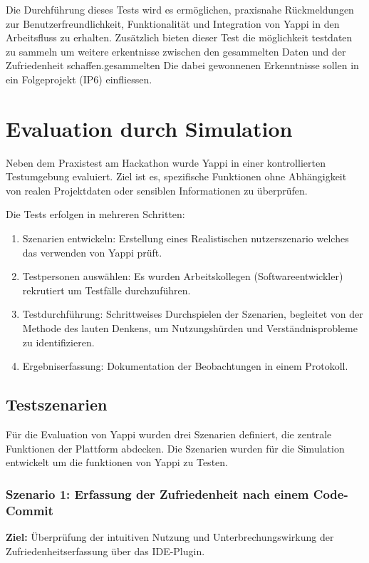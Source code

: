 \documentclass[12pt,a4paper]{report}
\begin{document}
 Die Durchführung dieses Tests wird es ermöglichen, praxisnahe Rückmeldungen zur Benutzerfreundlichkeit, Funktionalität
 und Integration von Yappi in den Arbeitsfluss zu erhalten. Zusätzlich bieten dieser Test die möglichkeit testdaten zu
 sammeln um weitere erkentnisse zwischen den gesammelten Daten und der Zufriedenheit schaffen.gesammelten Die dabei
 gewonnenen Erkenntnisse sollen in ein Folgeprojekt (IP6) einfliessen.

\section{Evaluation durch Simulation}

    Neben dem Praxistest am Hackathon wurde Yappi in einer kontrollierten Testumgebung evaluiert. Ziel ist es, spezifische
    Funktionen ohne Abhängigkeit von realen Projektdaten oder sensiblen Informationen zu überprüfen.

    Die Tests erfolgen in mehreren Schritten:
    \begin{enumerate}
        \item Szenarien entwickeln: Erstellung eines Realistischen nutzerszenario welches das verwenden von Yappi prüft.
        \item Testpersonen auswählen: Es wurden Arbeitskollegen (Softwareentwickler) rekrutiert um Testfälle durchzuführen.
        \item Testdurchführung: Schrittweises Durchspielen der Szenarien, begleitet von der Methode des lauten Denkens,
        um Nutzungshürden und Verständnisprobleme zu identifizieren.
        \item Ergebniserfassung: Dokumentation der Beobachtungen in einem Protokoll.
    \end{enumerate}


    \subsection{Testszenarien}

    Für die Evaluation von Yappi wurden drei Szenarien definiert, die zentrale Funktionen der Plattform abdecken.
    Die Szenarien wurden für die Simulation entwickelt um die funktionen von Yappi zu Testen.

    \subsubsection{Szenario 1: Erfassung der Zufriedenheit nach einem Code-Commit}
    \textbf{Ziel:} Überprüfung der intuitiven Nutzung und Unterbrechungswirkung der Zufriedenheitserfassung über das IDE-Plugin.
\end{document}
